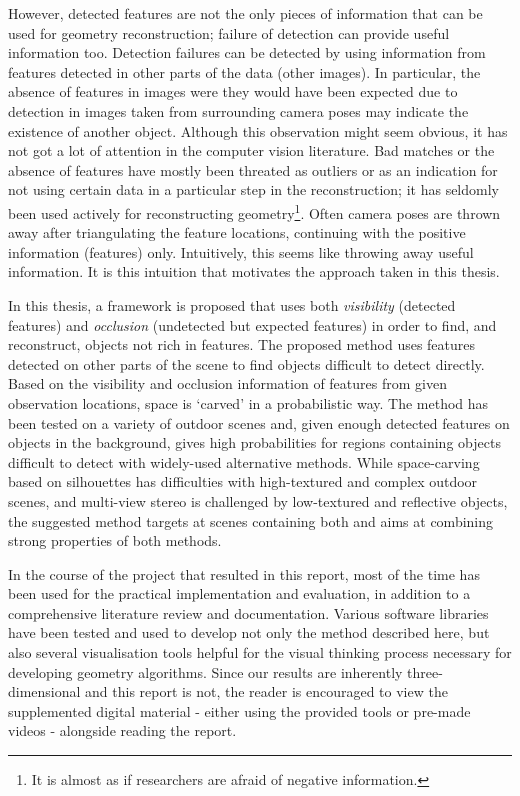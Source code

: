 However, detected features are not the only pieces of information that can be used for geometry reconstruction; failure of detection can provide useful information too. Detection failures can be detected by using information from features detected in other parts of the data (\eg other images). In particular, the absence of features in images were they would have been expected due to detection in images taken from surrounding camera poses may indicate the existence of another object. Although this observation might seem obvious, it has not got a lot of attention in the computer vision literature. Bad matches or the absence of features have mostly been threated as outliers or as an indication for not using certain data in a particular step in the reconstruction; it has seldomly been used actively for reconstructing geometry\footnote{It is almost as if researchers are afraid of negative information.}. Often camera poses are thrown away after triangulating the feature locations, continuing with the positive information (features) only. Intuitively, this seems like throwing away useful information. It is this intuition that motivates the approach taken in this thesis.

In this thesis, a framework is proposed that uses both \emph{visibility} (detected features) and \emph{occlusion} (undetected but expected features) in order to find, and reconstruct, objects not rich in features. The proposed method uses features detected on other parts of the scene to find objects difficult to detect directly. Based on the visibility and occlusion information of features from given observation locations, space is `carved' in a probabilistic way. The method has been tested on a variety of outdoor scenes and, given enough detected features on objects in the background, gives high probabilities for regions containing objects difficult to detect with widely-used alternative methods. While space-carving based on silhouettes has difficulties with high-textured and complex outdoor scenes, and multi-view stereo is challenged by low-textured and reflective objects, the suggested method targets at scenes containing both and aims at combining strong properties of both methods.

In the course of the project that resulted in this report, most of the time has been used for the practical implementation and evaluation, in addition to a comprehensive literature review and documentation. Various software libraries have been tested and used to develop not only the method described here, but also several visualisation tools helpful for the visual thinking process necessary for developing geometry algorithms. Since our results are inherently three-dimensional and this report is not, the reader is encouraged to view the supplemented digital material - either using the provided tools or pre-made videos - alongside reading the report.

